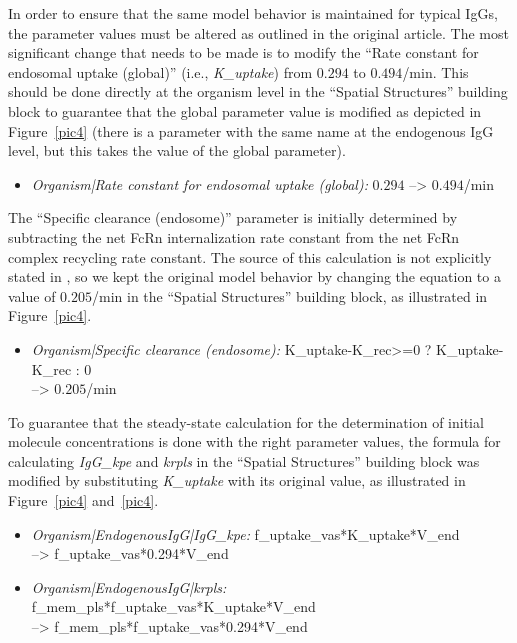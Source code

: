 \documentclass[fleqn,10pt]{physiome}
\begin{document}
In order to ensure that the same model behavior is maintained for typical IgGs, the parameter values must be altered as outlined in the original article. The most significant change that needs to be made is to modify the ``Rate constant for endosomal uptake (global)'' (i.e., \textit{K\_uptake}) from $0.294$ to $0.494$/min. This should be done directly at the organism level in the ``Spatial Structures'' building block to guarantee that the global parameter value is modified as depicted in Figure~\ref{pic4} (there is a parameter with the same name at the endogenous IgG level, but this takes the value of the global parameter).

\begin{itemize}
    \item \textit{Organism|Rate constant for endosomal uptake (global):} $0.294$ --> $0.494$/min
\end{itemize}

The ``Specific clearance (endosome)'' parameter is initially determined by subtracting the net FcRn internalization rate constant from the net FcRn complex recycling rate constant. The source of this calculation is not explicitly stated in \cite{niederalt2018generic}, so we kept the original model behavior by changing the equation to a value of $0.205$/min in the ``Spatial Structures'' building block, as illustrated in Figure~\ref{pic4}.
	
\begin{itemize}
    \item \textit{Organism|Specific clearance (endosome):} K\_uptake-K\_rec>=0 ? K\_uptake-K\_rec : 0 \\
    --> $0.205$/min
\end{itemize}

To guarantee that the steady-state calculation for the determination of initial molecule concentrations is done with the right parameter values, the formula for calculating \textit{IgG\_kpe} and \textit{krpls} in the ``Spatial Structures'' building block was modified by substituting \textit{K\_uptake} with its original value, as illustrated in Figure~\ref{pic4} and~\ref{pic4}.

\begin{itemize}
    \item \textit{Organism|EndogenousIgG|IgG\_kpe:} f\_uptake\_vas*K\_uptake*V\_end \\ --> f\_uptake\_vas*0.294*V\_end
    \item \textit{Organism|EndogenousIgG|krpls:} f\_mem\_pls*f\_uptake\_vas*K\_uptake*V\_end \\--> f\_mem\_pls*f\_uptake\_vas*0.294*V\_end
\end{itemize}
\end{document}
